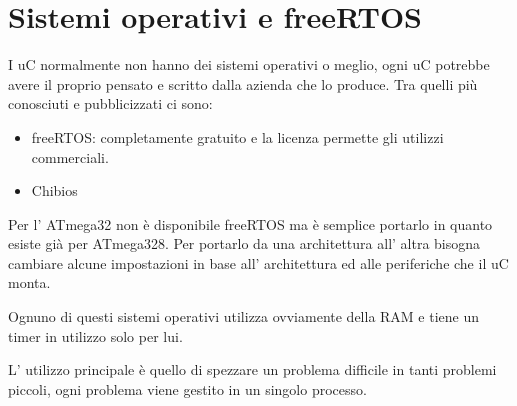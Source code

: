 \section{Sistemi operativi e freeRTOS}
I uC normalmente non hanno dei sistemi operativi o meglio, ogni uC potrebbe avere il proprio pensato e scritto dalla azienda che lo produce.
Tra quelli più conosciuti e pubblicizzati ci sono:
\begin{itemize}
    \item freeRTOS: completamente gratuito e la licenza permette gli utilizzi commerciali.
    \item Chibios
\end{itemize}

Per l' ATmega32 non è disponibile freeRTOS ma è semplice portarlo in quanto esiste già per ATmega328.
Per portarlo da una architettura all' altra bisogna cambiare alcune impostazioni in base all' architettura ed alle periferiche che il uC monta.

Ognuno di questi sistemi operativi utilizza ovviamente della RAM e tiene un timer in utilizzo solo per lui.

L' utilizzo principale è quello di spezzare un problema difficile in tanti problemi piccoli, ogni problema viene gestito in un singolo processo.

